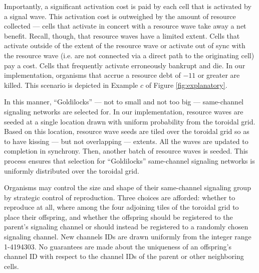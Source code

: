 Importantly, a significant activation cost is paid by each cell that is activated by a signal wave.
This activation cost is outweighed by the amount of resource collected --- cells that activate in concert with a resource wave take away a net benefit.
Recall, though, that resource waves have a limited extent.
Cells that activate outside of the extent of the resource wave or activate out of sync with the resource wave (i.e. are not connected via a direct path to the originating cell) pay a cost.
Cells that frequently activate erroneously bankrupt and die.
In our implementation, organisms that accrue a resource debt of $-11$ or greater are killed.
This scenario is depicted in Example $c$ of Figure \ref{fig:explanatory}.

In this manner, ``Goldilocks'' --- not to small and not too big --- same-channel signaling networks are selected for.
In our implementation, resource waves are seeded at a single location drawn  with uniform probability from the toroidal grid.
Based on this location, resource wave seeds are tiled over the toroidal grid so as to have kissing --- but not overlapping --- extents.
All the waves are updated to completion in synchrony.
Then, another batch of resource waves is seeded.
This process ensures that selection for ``Goldilocks'' same-channel signaling networks is uniformly distributed over the toroidal grid.

Organisms may control the size and shape of their same-channel signaling group by strategic control of reproduction.
Three choices are afforded: whether to reproduce at all, where among the four adjoining tiles of the toroidal grid to place their offspring, and whether the offspring should be registered to the parent's signaling channel or should instead be registered to a randomly chosen signaling channel.
New channels IDs are drawn uniformly from the integer range 1-4194303.
No guarantees are made about the uniqueness of an offspring's channel ID with respect to the channel IDs of the parent or other neighboring cells.

